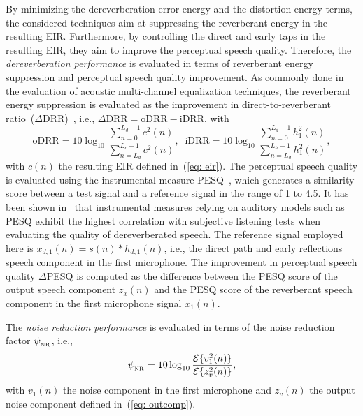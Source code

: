 \documentclass[draftcls,onecolumn,11pt]{IEEEtran}
\begin{document}
By minimizing the dereverberation error energy and the distortion energy terms, the considered techniques  aim at suppressing the reverberant energy in the resulting EIR.
Furthermore, by controlling the direct and early taps in the resulting EIR, they aim to improve the perceptual speech quality. 
Therefore, the \emph{dereverberation performance} is evaluated in terms of reverberant energy suppression and perceptual speech quality improvement. 
As commonly done in the evaluation of acoustic multi-channel equalization techniques, the reverberant energy suppression is evaluated as the improvement in direct-to-reverberant ratio~($\Delta$DRR)~\cite{Naylor_Derev_book}, i.e., $\Delta {\text{DRR}} = {\text{oDRR}} - {\text{iDRR}}$, with
\begin{equation}
{\text{oDRR}}\!\! = \!\!10 \log_{10} \frac{\sum\limits_{n=0}^{L_d-1} c^2(n)}{\sum\limits_{n=L_d}^{L_c-1} c^2(n)}, \; \; {\text{iDRR}}\!\! = \!\!10 \log_{10} \frac{\sum\limits_{n=0}^{L_d-1} h_1^2(n)}{\sum\limits_{n=L_d}^{L_h-1} h_1^2(n)},
\end{equation}
with $c(n)$ the resulting EIR defined in~(\ref{eq: eir}).
The perceptual speech quality is evaluated using the instrumental measure PESQ~\cite{PESQ}, which generates a similarity score between a test signal and a reference signal in the range of 1 to 4.5. 
It has been shown in~\cite{Goetze_AES_2010} that instrumental measures relying on auditory models such as PESQ exhibit the highest correlation with subjective listening tests when evaluating the quality of dereverberated speech.
The reference signal employed here is $x_{d,1}(n) = s(n) \ast h_{d,1}(n)$, i.e., the direct path and early reflections speech component in the first microphone. 
The improvement in perceptual speech quality $\Delta$PESQ is computed as the difference between the PESQ score of the output speech component $z_x(n)$ and the PESQ score of the reverberant speech component in the first microphone signal $x_1(n)$.

The \emph{noise reduction performance} is evaluated in terms of the noise reduction factor $\psi_{_{\rm NR}}$, i.e., 
\begin{equation}
\psi_{_{\rm NR}} = 10 \log_{10} \frac{{\cal{E}} \{v_1^2(n)\}}{{\cal{E}} \{z_v^2(n)\}},
\end{equation}
with $v_1(n)$ the noise component in the first microphone and $z_v(n)$ the output noise component defined in~(\ref{eq: outcomp}).
\end{document}
